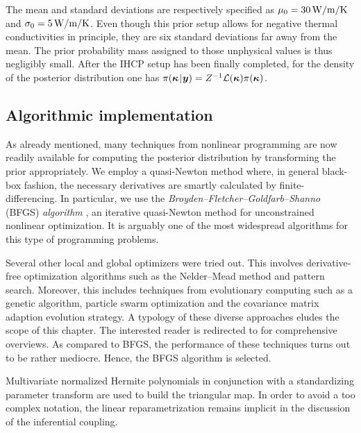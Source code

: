 The mean and standard deviations are respectively specified as \(\mu_0 = \unit[30]{W/m/K}\) and \(\sigma_0 = \unit[5]{W/m/K}\).
Even though this prior setup allows for negative thermal conductivities in principle, they are six standard deviations far away from the mean.
The prior probability mass assigned to those unphysical values is thus negligibly small.
After the IHCP setup has been finally completed,
for the density of the posterior distribution one has \(\pi(\bm{\kappa} {\:\!}|{\:\!} \bm{y}) = Z^{-1} \mathcal{L}(\bm{\kappa}) \pi(\bm{\kappa})\).

\subsection{Algorithmic implementation}
As already mentioned, many techniques from nonlinear programming \cite{Optim:Bazaraa2006,Optim:Sun2006,Optim:Zornig2014} are now readily available
for computing the posterior distribution by transforming the prior appropriately.
We employ a quasi-Newton method where, in general black-box fashion, the necessary derivatives are smartly calculated by finite-differencing.
In particular, we use the \emph{Broyden--Fletcher--Goldfarb--Shanno} (BFGS) \emph{algorithm} \cite{Optim:Broyden1970:a,Optim:Broyden1970:b,Optim:Fletcher1970,Optim:Goldfarb1970,Optim:Shanno1970},
an iterative quasi-Newton method for unconstrained nonlinear optimization.
It is arguably one of the most widespread algorithms for this type of programming problems.
\par %
Several other local and global optimizers were tried out.
This involves derivative-free optimization algorithms such as the Nelder--Mead method and pattern search.
Moreover, this includes techniques from evolutionary computing such as a genetic algorithm, particle swarm optimization and the covariance matrix adaption evolution strategy.
A typology of these diverse approaches eludes the scope of this chapter.
The interested reader is redirected to \cite{Optim:Nocedal2006,Optim:Eiben2015} for comprehensive overviews.
As compared to BFGS, the performance of these techniques turns out to be rather mediocre.
Hence, the BFGS algorithm is selected.
\par %
Multivariate normalized Hermite polynomials in conjunction with a standardizing parameter transform are used to build the triangular map.
In order to avoid a too complex notation, the linear reparametrization remains implicit in the discussion of the inferential coupling.
